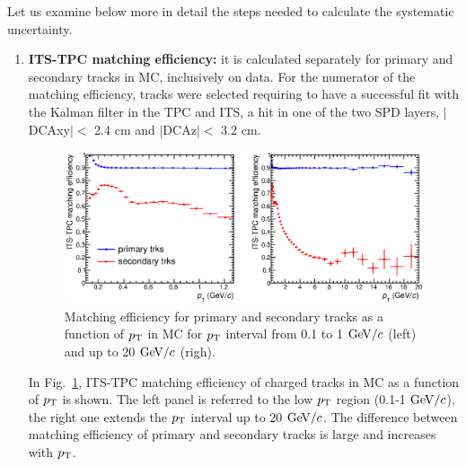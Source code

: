 Let us examine below more in detail the steps needed to 
calculate the systematic uncertainty.
\begin{enumerate}
\item {\bf ITS-TPC matching efficiency:} it is calculated separately for 
primary and secondary tracks in MC, inclusively on data. For 
the numerator of the matching efficiency, tracks were selected requiring 
to have a successful fit with the Kalman filter in the TPC and ITS, a hit in one of the two SPD layers, 
$|$DCAxy$|<$ 2.4 cm and $|$DCAz$|<$ 3.2 cm.
\begin{figure}[!htb]
\centering
\includegraphics[width=1\textwidth]{FigCap4/ITSTPC_matchEff_vsPt_LowFullpt.eps}
\caption{Matching efficiency for primary and secondary tracks as a function of $p_{\rm T}$ in MC for $p_{\rm T}$ interval from 0.1 to 1 $\mathrm{GeV}/c$ (left) and up to 20 $\mathrm{GeV}/c$ (righ). }
\label{fig:matcheff_pt}
\end{figure}

In Fig.~\ref{fig:matcheff_pt}, ITS-TPC matching efficiency 
of charged tracks in MC as a function of 
$p_{\rm T}$ is shown. The left panel is referred to the low $p_{\rm T}$ region (0.1-1 $\mathrm{GeV}/c$), 
the right one extends the $p_{\rm T}$ interval up to 20 $\mathrm{GeV}/c$. 
The difference between matching efficiency of primary and secondary tracks
is large and increases with $p_{\rm T}$.


\end{enumerate}
